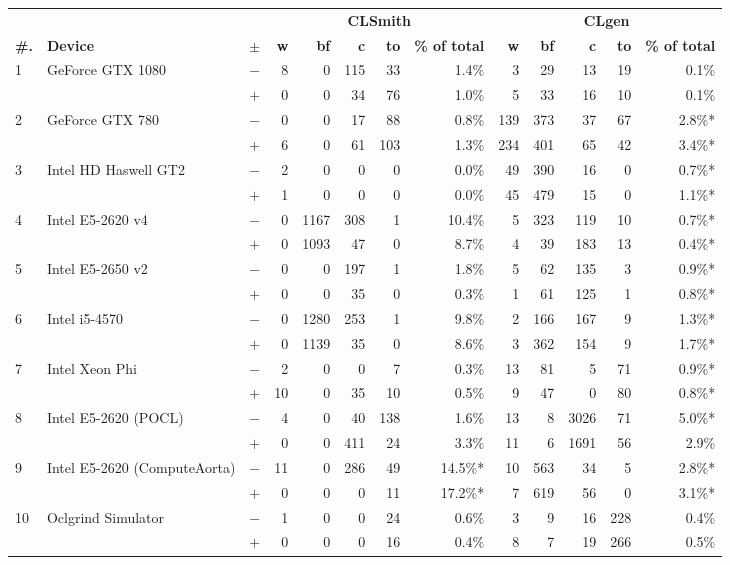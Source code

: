   \begin{tabular}{lll | rrrrr | rrrrr }
  \toprule
  & & & \multicolumn{5}{c|}{\textbf{CLSmith}} & \multicolumn{5}{c}{\textbf{CLgen}} \\
  \textbf{\#.} & \textbf{Device} & $\pm$ &
  \textbf{w} & \textbf{bf} & \textbf{c} & \textbf{to} & \textbf{\% of total} &
  \textbf{w} & \textbf{bf} & \textbf{c} & \textbf{to} & \textbf{\% of total} \\
  \midrule
  \multirow{ 2}{*}{1} & \multirow{ 2}{*}{GeForce GTX 1080} & $-$ & 8 & 0 & 115 & 33 & 1.4\%       & 3 & 29 & 13 & 19 & 0.1\% \\& & $+$ & 0 & 0 & 34 & 76 & 1.0\% & 5 & 33 & 16 & 10 & 0.1\% \\
\hline
\multirow{ 2}{*}{2} & \multirow{ 2}{*}{GeForce GTX 780} & $-$ & 0 & 0 & 17 & 88 & 0.8\%       & 139 & 373 & 37 & 67 & 2.8\%* \\& & $+$ & 6 & 0 & 61 & 103 & 1.3\% & 234 & 401 & 65 & 42 & 3.4\%* \\
\hline
\multirow{ 2}{*}{3} & \multirow{ 2}{*}{Intel HD Haswell GT2} & $-$ & 2 & 0 & 0 & 0 & 0.0\%       & 49 & 390 & 16 & 0 & 0.7\%* \\& & $+$ & 1 & 0 & 0 & 0 & 0.0\% & 45 & 479 & 15 & 0 & 1.1\%* \\
\hline
\multirow{ 2}{*}{4} & \multirow{ 2}{*}{Intel E5-2620 v4} & $-$ & 0 & 1167 & 308 & 1 & 10.4\%       & 5 & 323 & 119 & 10 & 0.7\%* \\& & $+$ & 0 & 1093 & 47 & 0 & 8.7\% & 4 & 39 & 183 & 13 & 0.4\%* \\
\hline
\multirow{ 2}{*}{5} & \multirow{ 2}{*}{Intel E5-2650 v2} & $-$ & 0 & 0 & 197 & 1 & 1.8\%       & 5 & 62 & 135 & 3 & 0.9\%* \\& & $+$ & 0 & 0 & 35 & 0 & 0.3\% & 1 & 61 & 125 & 1 & 0.8\%* \\
\hline
\multirow{ 2}{*}{6} & \multirow{ 2}{*}{Intel i5-4570} & $-$ & 0 & 1280 & 253 & 1 & 9.8\%       & 2 & 166 & 167 & 9 & 1.3\%* \\& & $+$ & 0 & 1139 & 35 & 0 & 8.6\% & 3 & 362 & 154 & 9 & 1.7\%* \\
\hline
\multirow{ 2}{*}{7} & \multirow{ 2}{*}{Intel Xeon Phi} & $-$ & 2 & 0 & 0 & 7 & 0.3\%       & 13 & 81 & 5 & 71 & 0.9\%* \\& & $+$ & 10 & 0 & 35 & 10 & 0.5\% & 9 & 47 & 0 & 80 & 0.8\%* \\
\hline
\multirow{ 2}{*}{8} & \multirow{ 2}{*}{Intel E5-2620 (POCL)} & $-$ & 4 & 0 & 40 & 138 & 1.6\%       & 13 & 8 & 3026 & 71 & 5.0\%* \\& & $+$ & 0 & 0 & 411 & 24 & 3.3\% & 11 & 6 & 1691 & 56 & 2.9\% \\
\hline
\multirow{ 2}{*}{9} & \multirow{ 2}{*}{Intel E5-2620 (ComputeAorta)} & $-$ & 11 & 0 & 286 & 49 & 14.5\%*       & 10 & 563 & 34 & 5 & 2.8\%* \\& & $+$ & 0 & 0 & 0 & 11 & 17.2\%* & 7 & 619 & 56 & 0 & 3.1\%* \\
\hline
\multirow{ 2}{*}{10} & \multirow{ 2}{*}{Oclgrind Simulator} & $-$ & 1 & 0 & 0 & 24 & 0.6\%       & 3 & 9 & 16 & 228 & 0.4\% \\& & $+$ & 0 & 0 & 0 & 16 & 0.4\% & 8 & 7 & 19 & 266 & 0.5\% \\
  \bottomrule
\end{tabular}

